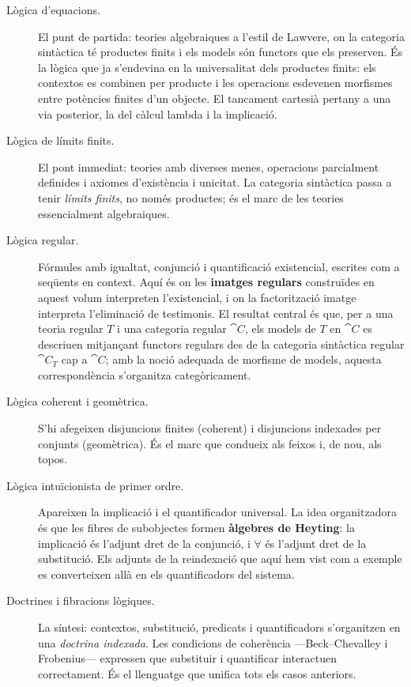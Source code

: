 \begin{description}
\item[Lògica d'equacions.] El punt de partida: teories algebraiques a l'estil de Lawvere, on la categoria sintàctica té productes finits i els models són functors que els preserven. És la lògica que ja s'endevina en la universalitat dels productes finits: els contextos es combinen per producte i les operacions esdevenen morfismes entre potències finites d'un objecte. El tancament cartesià pertany a una via posterior, la del càlcul lambda i la implicació.

\item[Lògica de límits finits.] El pont immediat: teories amb diverses menes, operacions parcialment definides i axiomes d'existència i unicitat. La categoria sintàctica passa a tenir \emph{límits finits}, no només productes; és el marc de les teories essencialment algebraiques.

\item[Lògica regular.] Fórmules amb igualtat, conjunció i quantificació existencial, escrites com a seqüents en context. Aquí és on les \textbf{imatges regulars} construïdes en aquest volum interpreten l'existencial, i on la factorització imatge interpreta l'eliminació de testimonis. El resultat central és que, per a una teoria regular $T$ i una categoria regular $\cat{C}$, els models de $T$ en $\cat{C}$ es descriuen mitjançant functors regulars des de la categoria sintàctica regular $\cat{C}_T$ cap a $\cat{C}$; amb la noció adequada de morfisme de models, aquesta correspondència s'organitza categòricament.

\item[Lògica coherent i geomètrica.] S'hi afegeixen disjuncions finites (coherent) i disjuncions indexades per conjunts (geomètrica). És el marc que condueix als feixos i, de nou, als topos.

\item[Lògica intuïcionista de primer ordre.] Apareixen la implicació i el quantificador universal. La idea organitzadora és que les fibres de subobjectes formen \textbf{àlgebres de Heyting}: la implicació és l'adjunt dret de la conjunció, i $\forall$ és l'adjunt dret de la substitució. Els adjunts de la reindexació que aquí hem vist com a exemple es converteixen allà en els quantificadors del sistema.

\item[Doctrines i fibracions lògiques.] La síntesi: contextos, substitució, predicats i quantificadors s'organitzen en una \emph{doctrina indexada}. Les condicions de coherència ---Beck--Chevalley i Frobenius--- expressen que substituir i quantificar interactuen correctament. És el llenguatge que unifica tots els casos anteriors.


\end{description}
